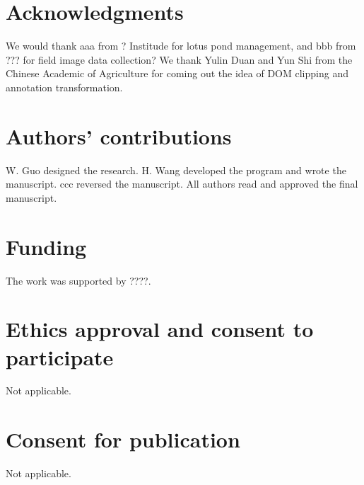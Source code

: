 \documentclass{configs/bmcart}
\begin{document}
\begin{backmatter}

\renewcommand*{\glsgroupskip}{}
\printglossary[type=\acronymtype, title=Abbreviations, nonumberlist]

\section*{Acknowledgments}
We would thank aaa from ? Institude for lotus pond management, and bbb from ??? for field image data collection? We thank Yulin Duan and Yun Shi from the Chinese Academic of Agriculture for coming out the idea of DOM clipping and annotation transformation.

\section*{Authors' contributions}
W. Guo designed the research. H. Wang developed the program and wrote the manuscript. ccc reversed the manuscript. All authors read and approved the final manuscript.

\section*{Funding}
The work was supported by ????.

\section*{Ethics approval and consent to participate}
Not applicable.

\section*{Consent for publication}
Not applicable.


\end{backmatter}
\end{document}
